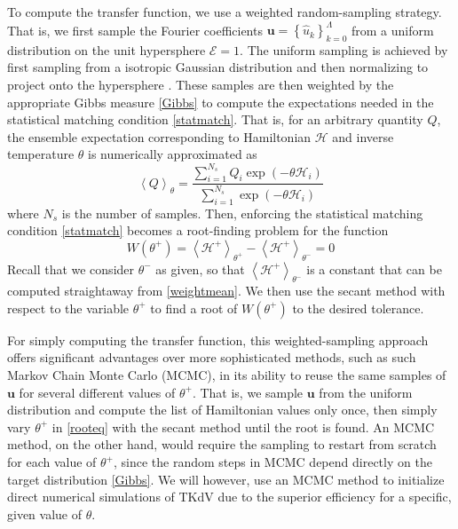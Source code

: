 \documentclass[11pt]{article}
\newcommand{\mean}[1]{\left< #1 \right>}
\newcommand{\En}{\mathcal{E}}
\newcommand{\uhat}{\hat{u}}
\newcommand{\Ham}{\mathcal{H}}
\newcommand{\Hdn}{\Ham^{+}}
\newcommand{\thup}{\theta^{-}}
\newcommand{\thdn}{\theta^{+}}
\newcommand{\Nsamp}{N_s}
\newcommand{\sumsamp}{\sum_{i=1}^{\Nsamp}}
\newcommand{\Fth}{W}
\newcommand{\uhvec}{\mathbf{u}}
\begin{document}
	To compute the transfer function, we use a weighted random-sampling strategy. That is, we first sample the Fourier coefficients $\uhvec = \left\{ \uhat_{k}\right\}_{k=0}^{\Lambda}$ from a uniform distribution on the unit hypersphere $\En = 1$. The uniform sampling is achieved by first sampling from a isotropic Gaussian distribution and then normalizing to project onto the hypersphere \cite{abramov2003}. These samples are then weighted by the appropriate Gibbs measure \eqref{Gibbs} to compute the expectations needed in the statistical matching condition \eqref{statmatch}. That is, for an arbitrary quantity $Q$, the ensemble expectation corresponding to Hamiltonian $\Ham$ and inverse temperature $\theta$ is numerically approximated as
\begin{equation}
\label{weightmean}
\mean{Q}_{\theta} = \frac{\sumsamp Q_i \exp(-\theta \Ham_i)} {\sumsamp \exp(-\theta \Ham_i)}
\end{equation}
where $\Nsamp$ is the number of samples. Then, enforcing the statistical matching condition \eqref{statmatch} becomes a root-finding problem for the function
\begin{equation}
\label{rooteq}
\Fth(\thdn) =  \mean{\Hdn}_{\thdn} - \mean{\Hdn}_{\thup} = 0
\end{equation}
Recall that we consider $\thup$ as given, so that $\mean{\Hdn}_{\thup}$ is a constant that can be computed straightaway from \eqref{weightmean}. We then use the secant method with respect to the variable $\thdn$ to find a root of $\Fth(\thdn)$ to the desired tolerance.

For simply computing the transfer function, this weighted-sampling approach offers significant advantages over more sophisticated methods, such as such Markov Chain Monte Carlo (MCMC), in its ability to reuse the same samples of $\uhvec$ for several different values of $\thdn$. That is, we sample $\uhvec$ from the uniform distribution and compute the list of Hamiltonian values only once, then simply vary $\thdn$ in \eqref{rooteq} with the secant method until the root is found. An MCMC method, on the other hand, would require the sampling to restart from scratch for each value of $\thdn$, since the random steps in MCMC depend directly on the target distribution \eqref{Gibbs}. We will however, use an MCMC method to initialize direct numerical simulations of TKdV due to the superior efficiency for a specific, given value of $\theta$.

\end{document}
